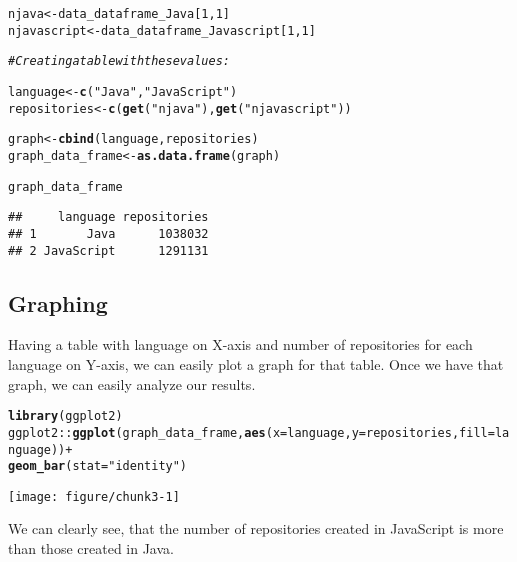 \documentclass{article}\usepackage[]{graphicx}\usepackage[]{color}
\makeatletter
\def\maxwidth{ %
  \ifdim\Gin@nat@width>\linewidth
    \linewidth
  \else
    \Gin@nat@width
  \fi
}
\newcommand{\hlnum}[1]{\textcolor[rgb]{0.686,0.059,0.569}{#1}}%
\newcommand{\hlstr}[1]{\textcolor[rgb]{0.192,0.494,0.8}{#1}}%
\newcommand{\hlcom}[1]{\textcolor[rgb]{0.678,0.584,0.686}{\textit{#1}}}%
\newcommand{\hlopt}[1]{\textcolor[rgb]{0,0,0}{#1}}%
\newcommand{\hlstd}[1]{\textcolor[rgb]{0.345,0.345,0.345}{#1}}%
\newcommand{\hlkwb}[1]{\textcolor[rgb]{0.69,0.353,0.396}{#1}}%
\newcommand{\hlkwc}[1]{\textcolor[rgb]{0.333,0.667,0.333}{#1}}%
\newcommand{\hlkwd}[1]{\textcolor[rgb]{0.737,0.353,0.396}{\textbf{#1}}}%
\newenvironment{kframe}{%
 \def\at@end@of@kframe{}%
 \ifinner\ifhmode%
  \def\at@end@of@kframe{\end{minipage}}%
  \begin{minipage}{\columnwidth}%
 \fi\fi%
 \def\FrameCommand##1{\hskip\@totalleftmargin \hskip-\fboxsep
 \colorbox{shadecolor}{##1}\hskip-\fboxsep
     \hskip-\linewidth \hskip-\@totalleftmargin \hskip\columnwidth}%
 \MakeFramed {\advance\hsize-\width
   \@totalleftmargin\z@ \linewidth\hsize
   \@setminipage}}%
 {\par\unskip\endMakeFramed%
 \at@end@of@kframe}
\newenvironment{knitrout}{}{} %
\makeatother
\begin{document}
\begin{knitrout}
\color{fgcolor}\begin{kframe}
\begin{alltt}
\hlstd{njava}\hlkwb{<-}\hlstd{data_dataframe_Java[}\hlnum{1}\hlstd{,}\hlnum{1}\hlstd{]}
\hlstd{njavascript}\hlkwb{<-}\hlstd{data_dataframe_Javascript[}\hlnum{1}\hlstd{,}\hlnum{1}\hlstd{]}

\hlcom{#Creating a table with these values:}

\hlstd{language}\hlkwb{<-}\hlkwd{c}\hlstd{(}\hlstr{"Java"}\hlstd{,}\hlstr{"JavaScript"}\hlstd{)}
\hlstd{repositories}\hlkwb{<-}\hlkwd{c}\hlstd{(}\hlkwd{get}\hlstd{(}\hlstr{"njava"}\hlstd{),}\hlkwd{get}\hlstd{(}\hlstr{"njavascript"}\hlstd{))}

\hlstd{graph}\hlkwb{<-}\hlkwd{cbind}\hlstd{(language,repositories)}
\hlstd{graph_data_frame}\hlkwb{<-}\hlkwd{as.data.frame}\hlstd{(graph)}

\hlstd{graph_data_frame}
\end{alltt}
\begin{verbatim}
##     language repositories
## 1       Java      1038032
## 2 JavaScript      1291131
\end{verbatim}
\end{kframe}
\end{knitrout}


\subsection*{Graphing}

Having a table with language on X-axis and number of repositories for each language on Y-axis, we can easily plot a graph for that table. Once we have that graph, we can easily analyze our results.

\begin{knitrout}
\color{fgcolor}\begin{kframe}
\begin{alltt}
\hlkwd{library}\hlstd{(ggplot2)}
\hlstd{ggplot2}\hlopt{::}\hlkwd{ggplot}\hlstd{(graph_data_frame,}\hlkwd{aes}\hlstd{(}\hlkwc{x}\hlstd{=language,}\hlkwc{y}\hlstd{=repositories,}\hlkwc{fill}\hlstd{=language))}\hlopt{+}
        \hlkwd{geom_bar}\hlstd{(}\hlkwc{stat}\hlstd{=}\hlstr{"identity"}\hlstd{)}
\end{alltt}
\end{kframe}
\texttt{[image: figure/chunk3-1]} 

\end{knitrout}

We can clearly see, that the number of repositories created in JavaScript is more than those created in Java.
\end{document}
